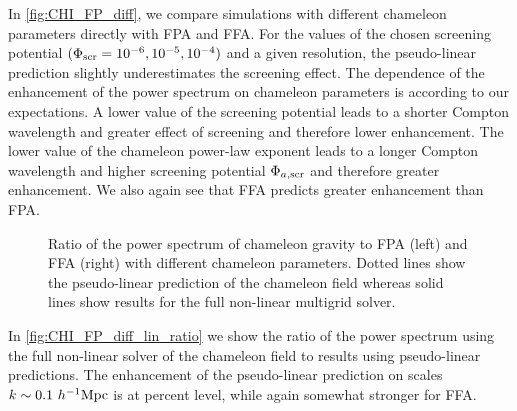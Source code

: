 In \autoref{fig:CHI_FP_diff}, we compare simulations with different chameleon parameters directly with FPA and FFA. For the values of the chosen screening potential $(\Phi_{\text{\scriptsize scr}}=10^{-6}, 10^{-5}, 10^{-4})$ and a given resolution, the pseudo-linear prediction slightly underestimates the screening effect. The dependence of the enhancement of the power spectrum on chameleon parameters is according to our expectations. A lower value of the screening potential leads to a shorter Compton wavelength and greater effect of screening and therefore lower enhancement. The lower value of the chameleon power-law exponent leads to a longer Compton wavelength and higher screening potential $\Phi_{a,\text{\scriptsize scr}}$ and therefore greater enhancement. We also again see that FFA predicts greater enhancement than FPA.

\begin{figure*}[tb]
  \centering
  \chileft
	\begin{subfigure}{1.2\textwidth}
	\end{subfigure}
	\begin{subfigure}{0.5\textwidth}
	\end{subfigure}%
	\begin{subfigure}{0.5\textwidth}
	\end{subfigure}
  \caption{Ratio of the power spectrum of chameleon gravity to FPA (left) and FFA (right) with different chameleon parameters. Dotted lines show the pseudo-linear prediction of the chameleon field whereas solid lines show results for the full non-linear multigrid solver.}
  \label{fig:CHI_FP_diff}
\end{figure*}

In \autoref{fig:CHI_FP_diff_lin_ratio} we show the ratio of the power spectrum using the full non-linear solver of the chameleon field to results using pseudo-linear predictions. The enhancement of the pseudo-linear prediction on scales $k\sim0.1~h^{-1}\text{Mpc}$ is at percent level, while again somewhat stronger for FFA.

